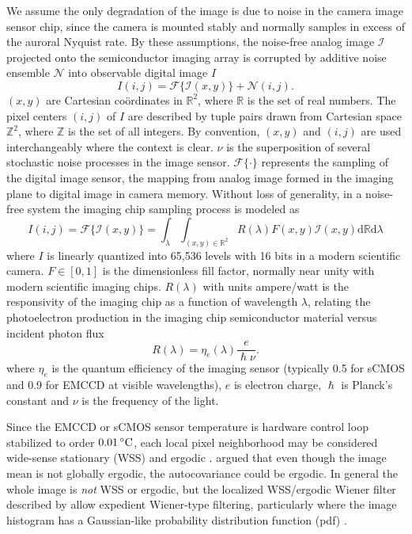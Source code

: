 We assume the only degradation of the image is due to noise in the camera image sensor chip, since the camera is mounted stably and normally samples in excess of the auroral Nyquist rate.
By these assumptions, the noise-free analog image $\mathscr{I}$ projected onto the semiconductor imaging array is corrupted by additive noise ensemble $\mathcal{N}$ into observable digital image $I$
\begin{equation}\label{eq:imgmapsimple}
I(i,j) = \mathscr{F}\lbrace\mathscr{I}(x,y)\rbrace + \mathcal{N}(i,j).
\end{equation}
$(x,y)$ are Cartesian coördinates in $\mathbb{R}^2$, where $\mathbb{R}$ is the set of real numbers.
The pixel centers $(i,j)$ of $I$ are described by tuple pairs drawn from Cartesian space $\mathbb{Z}^2$, where $\mathbb{Z}$ is the set of all integers.
By convention, $(x,y)$ and $(i,j)$ are used interchangeably where the context is clear.
$\nu$ is the superposition of several stochastic noise processes in the image sensor.
$\mathscr{F}\lbrace\cdot\rbrace$ represents the sampling of the digital image sensor, the mapping from analog image formed in the imaging plane to digital image in camera memory.
Without loss of generality, in a noise-free system the imaging chip sampling process is modeled as
\begin{equation}\label{eq:anadig}
I(i,j) =\mathscr{F}\lbrace\mathscr{I}(x,y)\rbrace = \int_\lambda \int_{(x,y)\in \mathbb{R}^2} R(\lambda)F(x,y)\mathscr{I}(x,y) \textrm{d}\mathbb{R} \textrm{d}\lambda
\end{equation}
where $I$ is linearly quantized into 65,536 levels with 16 bits in a modern scientific camera.
$F \in [0,1]$ is the dimensionless fill factor, normally near unity with modern scientific imaging chips.
$R(\lambda)$ with units ampere/watt is the responsivity of the imaging chip as a function of wavelength $\lambda$, relating the photoelectron production in the imaging chip semiconductor material versus incident photon flux \citep{saha2015}
\begin{equation}
R(\lambda) = \eta_e(\lambda) \frac{e}{\hslash \nu}.
\end{equation}
where $\eta_e$ is the quantum efficiency of the imaging sensor (typically 0.5 for sCMOS and 0.9 for EMCCD at visible wavelengths), $e$ is electron charge, $\hslash$ is Planck's constant and $\nu$ is the frequency of the light.


Since the EMCCD or sCMOS sensor temperature is hardware control loop stabilized to order $\unit[0.01]{^\circ C}$, each local pixel neighborhood may be considered wide-sense stationary (WSS) and ergodic \citep{kuan1985}.
\citet{hunt1980} argued that even though the image mean is not globally ergodic, the autocovariance could be ergodic.
In general the whole image is \textit{not} WSS or ergodic, but the localized WSS/ergodic Wiener filter described by \citet{kuan1985,jin2003} allow expedient Wiener-type filtering, particularly where the image histogram has a Gaussian-like probability distribution function (pdf) \citep{jin2003}.

